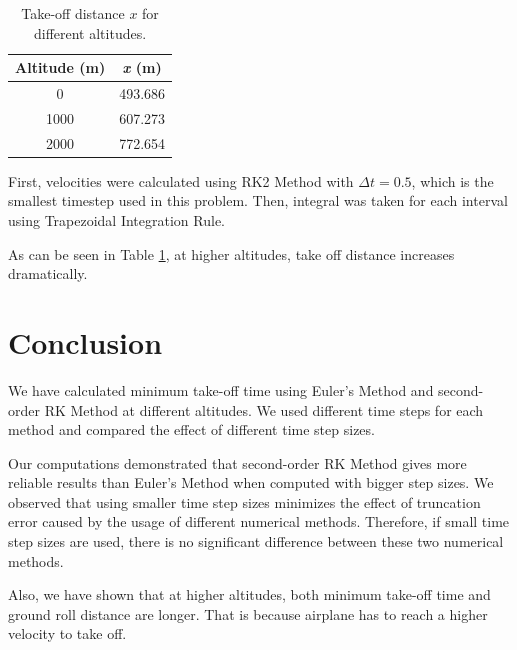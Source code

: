 \documentclass[letterpaper,12pt]{article}
\begin{document}
\begin{table}[!h]
        \begin{center}
        \caption{Take-off distance $x$ for different altitudes.}
        \vspace{1em}
        \label{tbl:takeoff}
        \begin{tabular}{|c|c|} 
        \hline
        \multicolumn{1}{|c|}{\bf{Altitude (m)}} & \multicolumn{1}{c|}{\bf{\textit{x} (m)}} \\
        \hline
        0 &   493.686 \\ \hline
        1000 &   607.273 \\ \hline
        2000 &   772.654 \\ \hline
        \end{tabular}
        \end{center}
\end{table}

First, velocities were calculated using RK2 Method with $\Delta t = 0.5$, which is the smallest
timestep used in this problem. Then, integral was taken for each interval using Trapezoidal Integration Rule.

As can be seen in Table \ref{tbl:takeoff}, at higher altitudes, take off distance increases dramatically.

\section{Conclusion}
We have calculated minimum take-off time using Euler's Method and second-order RK Method at different altitudes.
We used different time steps for each method and compared the effect of different time step sizes. 

Our computations demonstrated that second-order RK Method gives more reliable results than Euler's Method
when computed with bigger step sizes. We observed that using smaller time step sizes minimizes the effect of truncation error
caused by the usage of different numerical methods. Therefore, if small time step sizes are used, there is no 
significant difference between these two numerical methods.

Also, we have shown that at higher altitudes, both minimum take-off time and ground roll distance are longer.
That is because airplane has to reach a higher velocity to take off.
\end{document}
